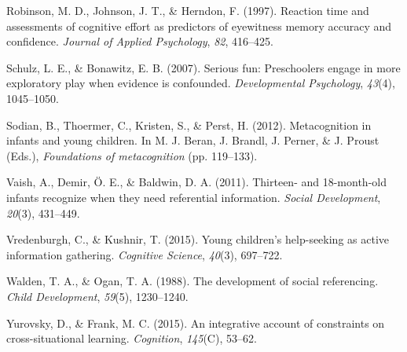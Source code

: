\documentclass[10pt, letterpaper]{article}
\begin{document}
\hypertarget{ref-Robinson1997}{}
Robinson, M. D., Johnson, J. T., \& Herndon, F. (1997). Reaction time
and assessments of cognitive effort as predictors of eyewitness memory
accuracy and confidence. \emph{Journal of Applied Psychology},
\emph{82}, 416--425.

\hypertarget{ref-Schulz2007}{}
Schulz, L. E., \& Bonawitz, E. B. (2007). Serious fun: Preschoolers
engage in more exploratory play when evidence is confounded.
\emph{Developmental Psychology}, \emph{43}(4), 1045--1050.

\hypertarget{ref-Sodian2012}{}
Sodian, B., Thoermer, C., Kristen, S., \& Perst, H. (2012).
Metacognition in infants and young children. In M. J. Beran, J. Brandl,
J. Perner, \& J. Proust (Eds.), \emph{Foundations of metacognition} (pp.
119--133).

\hypertarget{ref-Vaish2011}{}
Vaish, A., Demir, Ö. E., \& Baldwin, D. A. (2011). Thirteen- and
18-month-old infants recognize when they need referential information.
\emph{Social Development}, \emph{20}(3), 431--449.

\hypertarget{ref-Vredenburgh2015}{}
Vredenburgh, C., \& Kushnir, T. (2015). Young children's help-seeking as
active information gathering. \emph{Cognitive Science}, \emph{40}(3),
697--722.

\hypertarget{ref-Walden1988}{}
Walden, T. A., \& Ogan, T. A. (1988). The development of social
referencing. \emph{Child Development}, \emph{59}(5), 1230--1240.

\hypertarget{ref-Yurovsky2015}{}
Yurovsky, D., \& Frank, M. C. (2015). An integrative account of
constraints on cross-situational learning. \emph{Cognition},
\emph{145}(C), 53--62.
\end{document}
